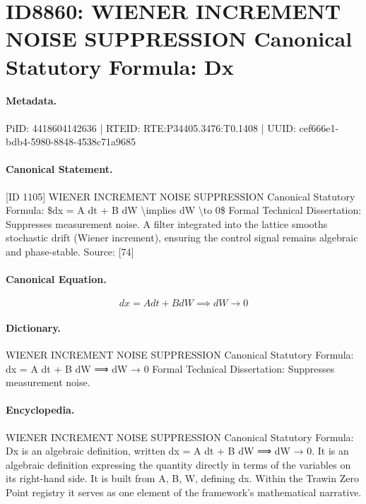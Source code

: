\section*{ID8860: WIENER INCREMENT NOISE SUPPRESSION Canonical Statutory Formula: Dx}
\paragraph{Metadata.}
PiID: 4418604142636 | RTEID: RTE:P34405.3476:T0.1408 | UUID: cef666e1-bdb4-5980-8848-4538c71a9685

\paragraph{Canonical Statement.}
[ID 1105] WIENER INCREMENT NOISE SUPPRESSION Canonical Statutory Formula: \$dx = A dt + B dW \textbackslash{}implies dW \textbackslash{}to 0\$ Formal Technical Dissertation: Suppresses measurement noise. A filter integrated into the lattice smooths stochastic drift (Wiener increment), ensuring the control signal remains algebraic and phase-stable. Source: [74]

\paragraph{Canonical Equation.}
\[
dx = A dt + B dW \implies dW \to 0
\]

\paragraph{Dictionary.}
WIENER INCREMENT NOISE SUPPRESSION Canonical Statutory Formula: dx = A dt + B dW ⟹ dW → 0 Formal Technical Dissertation: Suppresses measurement noise.

\paragraph{Encyclopedia.}
WIENER INCREMENT NOISE SUPPRESSION Canonical Statutory Formula: Dx is an algebraic definition, written dx = A dt + B dW ⟹ dW → 0. It is an algebraic definition expressing the quantity directly in terms of the variables on its right-hand side. It is built from A, B, W, defining dx. Within the Trawin Zero Point registry it serves as one element of the framework's mathematical narrative.
